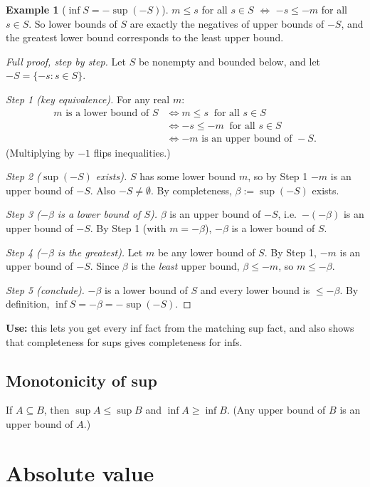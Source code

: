 \documentclass[11pt]{article}
\theoremstyle{definition}
\newtheorem{ex}[defn]{Example}
\newcommand{\key}[1]{\textcolor{red!70!black}{\textbf{#1}}}
\begin{document}
\begin{ex}[$\inf S=-\sup(-S)$]
$m\le s$ for all $s\in S$ $\iff$ $-s\le -m$ for all $s\in S$. So lower
bounds of $S$ are exactly the negatives of upper bounds of $-S$, and the
greatest lower bound corresponds to the least upper bound.

\begin{proof}[Full proof, step by step]
Let $S$ be nonempty and bounded below, and let $-S=\{-s:s\in S\}$.

\emph{Step 1 (key equivalence).} For any real $m$:
\begin{align*}
m\text{ is a lower bound of }S
&\iff m\le s\ \text{ for all } s\in S\\
&\iff -s\le -m\ \text{ for all } s\in S\\
&\iff -m\text{ is an upper bound of }-S.
\end{align*}
(Multiplying by $-1$ flips inequalities.)

\emph{Step 2 ($\sup(-S)$ exists).} $S$ has some lower bound $m$, so by
Step 1 $-m$ is an upper bound of $-S$. Also $-S\ne\emptyset$. By
completeness, $\beta:=\sup(-S)$ exists.

\emph{Step 3 ($-\beta$ is a lower bound of $S$).} $\beta$ is an upper
bound of $-S$, i.e.\ $-(-\beta)$ is an upper bound of $-S$. By Step 1
(with $m=-\beta$), $-\beta$ is a lower bound of $S$.

\emph{Step 4 ($-\beta$ is the greatest).} Let $m$ be any lower bound of
$S$. By Step 1, $-m$ is an upper bound of $-S$. Since $\beta$ is the
\emph{least} upper bound, $\beta\le-m$, so $m\le-\beta$.

\emph{Step 5 (conclude).} $-\beta$ is a lower bound of $S$ and every lower
bound is $\le-\beta$. By definition, $\inf S=-\beta=-\sup(-S)$.
\end{proof}
\noindent\key{Use:} this lets you get every inf fact from the matching sup
fact, and also shows that completeness for sups gives completeness for
infs.
\end{ex}

\subsection{Monotonicity of sup}
If $A\subseteq B$, then $\sup A\le\sup B$ and $\inf A\ge\inf B$.
(Any upper bound of $B$ is an upper bound of $A$.)

\section{Absolute value}
\end{document}
